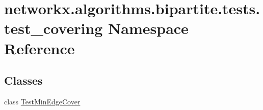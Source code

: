 \hypertarget{namespacenetworkx_1_1algorithms_1_1bipartite_1_1tests_1_1test__covering}{}\section{networkx.\+algorithms.\+bipartite.\+tests.\+test\+\_\+covering Namespace Reference}
\label{namespacenetworkx_1_1algorithms_1_1bipartite_1_1tests_1_1test__covering}
\subsection*{Classes}
\begin{DoxyCompactItemize}
\item 
class \hyperlink{classnetworkx_1_1algorithms_1_1bipartite_1_1tests_1_1test__covering_1_1TestMinEdgeCover}{Test\+Min\+Edge\+Cover}
\end{DoxyCompactItemize}
